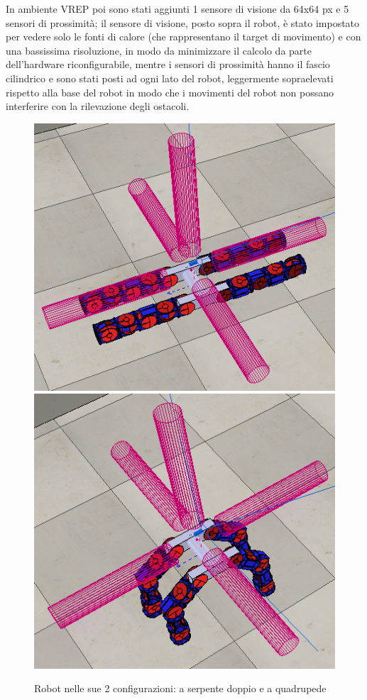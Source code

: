 \documentclass[a4paper,titlepage]{book}
\begin{document}
In ambiente VREP poi sono stati aggiunti 1 sensore di visione da 64x64 px e 5 sensori di prossimità; il sensore di visione, posto sopra il robot, è stato impostato per vedere solo le fonti di calore (che rappresentano il target di movimento) e con una bassissima risoluzione, in modo da minimizzare il calcolo da parte dell'hardware riconfigurabile, mentre i sensori di prossimità hanno il fascio cilindrico e sono stati posti ad ogni lato del robot, leggermente sopraelevati rispetto alla base del robot in modo che i movimenti del robot non possano interferire con la rilevazione degli ostacoli.

\begin{figure}[htbp]
\centering
\includegraphics[scale=0.3]{tobor_sdraiato.png}
\qquad\qquad
\includegraphics[scale=0.3]{tobor_quadrupede.png}
\caption{Robot nelle sue 2 configurazioni: a serpente doppio e a quadrupede}\label{fig:71}
\end{figure}
\end{document}
